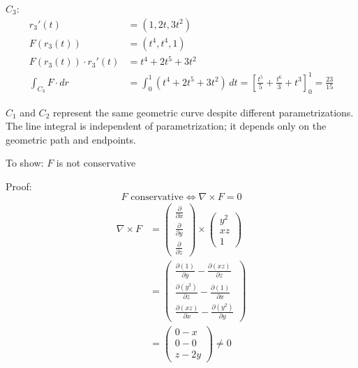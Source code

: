 \begin{solution}
	$C_3$:
	$$
		\begin{aligned}
			r_3'(t)                 & = (1, 2t, 3t^2)                                                                                                       \\
			F(r_3(t))               & = (t^4, t^4, 1)                                                                                                       \\
			F(r_3(t)) \cdot r_3'(t) & = t^4 + 2t^5 + 3t^2                                                                                                   \\
			\int_{C_3} F \cdot dr   & = \int_0^1 (t^4 + 2t^5 + 3t^2) \, dt = \left[ \frac{t^5}{5} + \frac{t^6}{3} + t^3 \right]_0^1 = \boxed{\frac{23}{15}}
		\end{aligned}
	$$

	\bigskip
	$C_1$ and $C_2$ represent the same geometric curve despite different parametrizations. The line integral is independent of parametrization; it depends only on the geometric path and endpoints.

	\bigskip
	\noindent To show: $F$ is not conservative

	\noindent Proof:
	$$
		F \text{ conservative} \iff \nabla \times F = 0
	$$
	$$
		\begin{aligned}
			\nabla \times F & = \begin{pmatrix} \frac{\partial}{\partial x} \\ \frac{\partial}{\partial y} \\ \frac{\partial}{\partial z} \end{pmatrix} \times \begin{pmatrix} y^2 \\ xz \\ 1 \end{pmatrix}                                                               \\
			                & = \begin{pmatrix} \frac{\partial(1)}{\partial y} - \frac{\partial(xz)}{\partial z} \\ \frac{\partial(y^2)}{\partial z} - \frac{\partial(1)}{\partial x} \\ \frac{\partial(xz)}{\partial x} - \frac{\partial(y^2)}{\partial y} \end{pmatrix} \\
			                & = \begin{pmatrix} 0 - x \\ 0 - 0 \\ z - 2y \end{pmatrix} \neq 0
		\end{aligned}
	$$

\end{solution}

